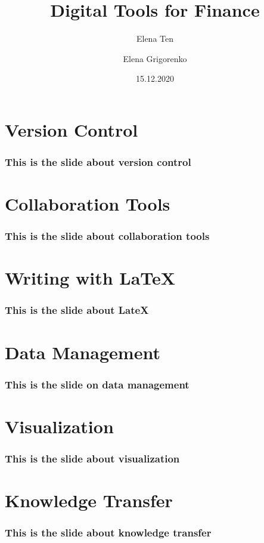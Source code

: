 \documentclass {beamer}
\title{Digital Tools for Finance}
\author [Ten, Grigorenko] {Elena Ten \and Elena Grigorenko}
\institute [UZH] {University of Zurich}
\date {15.12.2020}
\begin{document}
\frame{\titlepage}




\section{Version Control}
\begin{frame}
\frametitle{This is the slide about version control}

\end{frame}


\section{Collaboration Tools}
\begin{frame}
\frametitle{This is the slide about collaboration tools}

\end{frame}


\section{Writing with LaTeX}
\begin{frame}
\frametitle{This is the slide about LateX}

\end{frame}

\section{Data Management}
\begin{frame}
\frametitle{This is the slide on data management}

\end{frame}

\section{Visualization}
\begin{frame}
\frametitle{This is the slide about visualization}

\end{frame}


\section{Knowledge Transfer}
\begin{frame}
\frametitle{This is the slide about knowledge transfer}

\end{frame}
\end{document}
